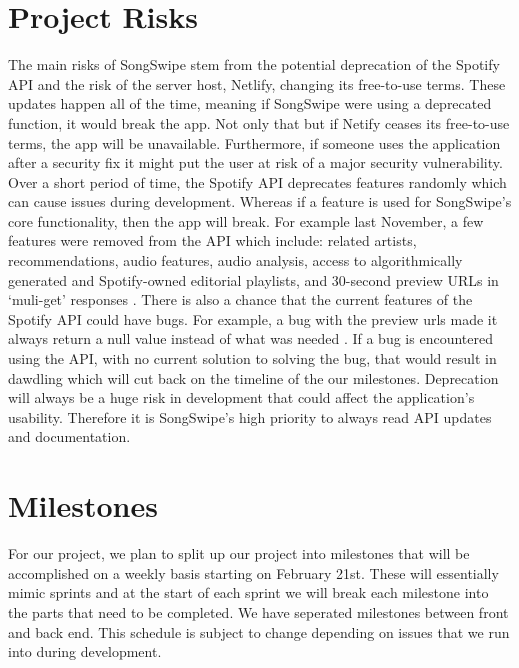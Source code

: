 \documentclass{article}
\begin{document}
\section{Project Risks}
\quad The main risks of SongSwipe stem from the potential deprecation of the Spotify API and the risk of the server host, Netlify, changing its free-to-use terms. These updates happen all of the time, meaning if SongSwipe were using a deprecated function, it would break the app. Not only that but if Netify ceases its free-to-use terms, the app will be unavailable. Furthermore, if someone uses the application after a security fix it might put the user at risk of a major security vulnerability.  \\

Over a short period of time, the Spotify API deprecates features randomly which can cause issues during development. Whereas if a feature is used for SongSwipe's core functionality, then the app will break. For example last November, a few features were removed from the API which include: related artists, recommendations, audio features, audio analysis, access to algorithmically generated and Spotify-owned editorial playlists, and 30-second preview URLs in ‘muli-get’ responses \cite{Spotify_api_removal}. There is also a chance that the current features of the Spotify API could have bugs. For example, a bug with the preview urls made it always return a null value instead of what was needed \cite{Spotify_preview_url}. If a bug is encountered using the API, with no current solution to solving the bug, that would result in dawdling which will cut back on the timeline of the our milestones. Deprecation will always be a huge risk in development that could affect the application's usability. Therefore it is SongSwipe's high priority to always read API updates and documentation.

\section{Milestones}
\quad For our project, we plan to split up our project into milestones that will be accomplished on a weekly basis starting on February 21st. These will essentially mimic sprints and at the start of each sprint we will break each milestone into the parts that need to be completed. We have seperated milestones between front and back end. This schedule is subject to change depending on issues that we run into during development. 
\end{document}
